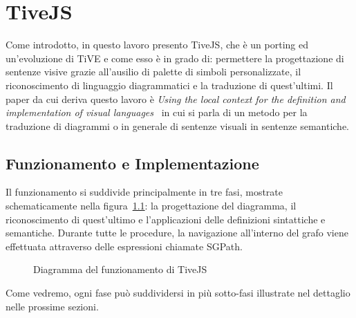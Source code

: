 ﻿\chapter{TiveJS}
    Come introdotto, in questo lavoro presento TiveJS, che è un porting ed un'evoluzione di TiVE e come esso è in grado di: permettere la progettazione di sentenze visive grazie all'ausilio di palette di simboli personalizzate, il riconoscimento di linguaggio diagrammatici e la traduzione di quest'ultimi.
    \newline
    Il paper da cui deriva questo lavoro è \textit{Using the local context for the definition and implementation of visual languages}~\cite{localcontext} in cui si parla di un metodo per la traduzione di diagrammi o in generale di sentenze visuali in sentenze semantiche.

    \section{Funzionamento e Implementazione}
        Il funzionamento si suddivide principalmente in tre fasi, mostrate schematicamente nella figura~\ref{fig:funzionamento}: la progettazione del diagramma, il riconoscimento di quest'ultimo e l'applicazioni delle definizioni sintattiche e semantiche. Durante tutte le procedure, la navigazione all'interno del grafo viene effettuata attraverso delle espressioni chiamate SGPath.
        \newline
        \begin{figure}[htbp]
            \centering
            \caption{Diagramma del funzionamento di TiveJS}
            \label{fig:funzionamento}
        \end{figure}

        Come vedremo, ogni fase può suddividersi in più sotto-fasi illustrate nel dettaglio nelle prossime sezioni.

